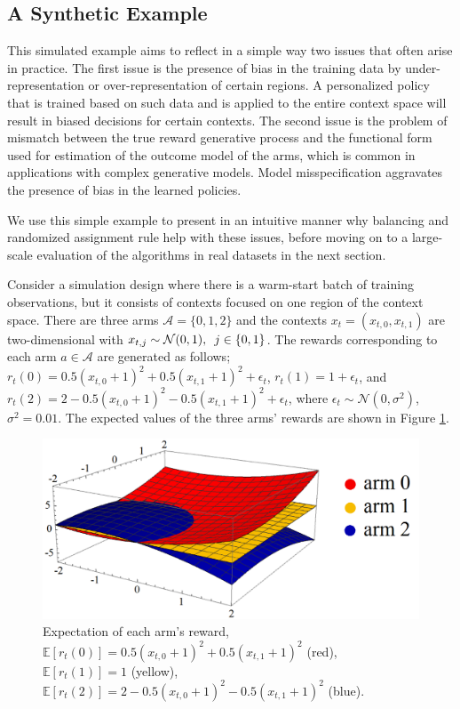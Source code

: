 \documentclass[letterpaper]{article} %
\def\A{\mathcal{A}}
\def\E{\mathbb{E}}
\begin{document}
\subsection{A Synthetic Example}\label{subsec:pedagogic}

This simulated example aims to reflect in a simple way two issues that often arise in practice.
The first issue is the presence of bias in the training data by under-representation or over-representation of certain regions. A personalized policy that is trained based on such data and is applied to the entire context space will result in biased decisions for certain contexts.  The second issue is the problem of mismatch between the true reward generative process and the functional form used for estimation of the outcome model of the arms, which is common in applications with complex generative models. Model misspecification aggravates the presence of bias in the learned policies.

We use this simple example to present in an intuitive manner why balancing and randomized assignment rule help with these issues, before moving on to a large-scale evaluation of the algorithms in real datasets in the next section.

Consider a simulation design where there is a warm-start batch of training observations, but it consists of contexts focused on one region of the context space.
There are three arms $\A = \{0, 1, 2\}$ and the contexts $x_t = (x_{t,0}, x_{t,1})$ are two-dimensional with $x_{t,j} \sim \mathcal{N}(0, 1), \enskip j \in \{0, 1\}$.
The rewards corresponding to each arm $a \in \A$ are generated as follows; $r_t(0) = 0.5 (x_{t,0} + 1)^2 + 0.5 (x_{t,1} + 1)^2 + \epsilon_t$, $r_t(1) = 1 + \epsilon_t$, and $r_t(2) = 2 - 0.5 (x_{t,0} + 1)^2 - 0.5 (x_{t,1} + 1)^2 +\epsilon_t$, where $\epsilon_t \sim \mathcal{N}(0, \sigma^2)$, $\sigma^2 = 0.01$.
The expected values of the three arms' rewards are shown in Figure \ref{PotentialOutcomes}.
\begin{figure}[!htb]
\centering
\includegraphics[width=0.5\columnwidth]{Figures/PotentialOutcomes.png}
\caption{Expectation of each arm's reward, $\E[r_t(0)] = 0.5 (x_{t,0} + 1)^2 + 0.5 (x_{t,1} + 1)^2$ (red), $\E[r_t(1)] = 1$ (yellow), $\E[r_t(2)] = 2 - 0.5 (x_{t,0} + 1)^2 - 0.5 (x_{t,1} + 1)^2$ (blue).}
\label{PotentialOutcomes}
\end{figure}
\end{document}
